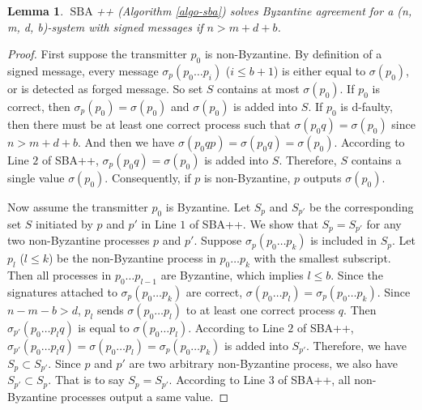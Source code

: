 \documentclass[11pt,conference,compsoc,onecolumn,romanappendices]{IEEEtran}
\newcommand{\tmop}[1]{\ensuremath{\operatorname{#1}}}
\newtheorem{lemma}{Lemma}
\begin{document}
\begin{lemma}
  $\tmop{SBA}$++ (Algorithm \ref{algo-sba}) solves Byzantine agreement for a (n,
  m, d, b)-system with signed messages if $n > m + d + b$.
\end{lemma}

\begin{proof}
  First suppose the transmitter $p_0$ is non-Byzantine. By definition of a signed
  message, every message $\sigma_p (p_0 \ldots p_i)$ ($i \leqslant b + 1$) is
  either equal to $\sigma (p_0)$, or is detected as forged message. So set
  $S$ contains at most $\sigma (p_0)$. If $p_0$ is correct, then
  $\sigma_p (p_0) = \sigma (p_0)$ and $\sigma (p_0)$ is added into $S$. If
  $p_0$ is d-faulty, then there must be at least one correct process such that $\sigma (p_0 q) = \sigma (p_0)$
  since $n > m + d + b$. And then we have $\sigma (p_0 q p) = \sigma (p_0 q) =
  \sigma (p_0)$. According to Line $2$ of SBA++, $\sigma_p (p_0 q) =
  \sigma (p_0)$ is added into $S$. Therefore, $S$ contains a single value
  $\sigma (p_0)$. Consequently, if $p$ is non-Byzantine, $p$ outputs $\sigma (p_0)$.
  
  Now assume the transmitter $p_0$ is Byzantine.
  Let $S_p$ and $S_{p'}$ be the corresponding set $S$ initiated by $p$ and $p'$
  in Line $1$ of SBA++.
  We show that $S_p = S_{p'}$
  for any two non-Byzantine processes $p$ and $p'$. Suppose $\sigma_p (p_0 \ldots
  p_k)$ is included in $S_p$. Let $p_l$ ($l \leqslant k$) be the non-Byzantine
  process in $p_0 \ldots p_k$ with the smallest subscript. Then all processes
  in $p_0 \ldots p_{l - 1}$ are Byzantine, which implies $l \leqslant b$. Since
  the signatures attached to $\sigma_p (p_0 \ldots p_k)$ are correct, $\sigma
  (p_0 \ldots p_l) = \sigma_p (p_0 \ldots p_k)$. Since $n - m - b > d$, $p_l$
  sends $\sigma (p_0 \ldots p_l)$ to at least one correct process $q$. Then $\sigma_{p'} (p_0 \ldots p_l q)$
  is equal to $\sigma (p_0 \ldots p_l)$. According to Line $2$ of
  SBA++, $\sigma_{p'} (p_0 \ldots p_l q) = \sigma (p_0 \ldots p_l) =
  \sigma_p (p_0 \ldots p_k)$ is added into $S_{p'}$. Therefore, we have $S_p
  \subset S_{p'}$. Since $p$ and $p'$ are two arbitrary non-Byzantine process, we
  also have $S_{p'} \subset S_p$. That is to say $S_p = S_{p'}$. According to
  Line $3$ of SBA++, all non-Byzantine processes output a same value.
\end{proof}
\end{document}
